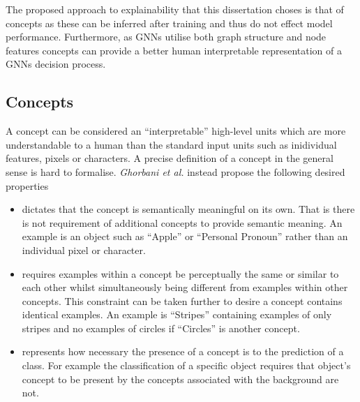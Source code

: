 The proposed approach to explainability that this dissertation choses is that of concepts as these can be inferred after training and thus do not effect model performance.
Furthermore, as GNNs utilise both graph structure and node features concepts can provide a better human interpretable representation of a GNNs decision process.

\subsection{Concepts}



A concept can be considered an ``interpretable'' high-level units which are more understandable to a human than the standard input units such as inidividual features, pixels or characters.
A precise definition of a concept in the general sense is hard to formalise.
\textit{Ghorbani et al.} instead propose the following desired properties
\begin{itemize}
    \item[]
        dictates that the concept is semantically meaningful on its own.
        That is there is not requirement of additional concepts to provide semantic meaning.
        An example is an object such as ``Apple'' or ``Personal Pronoun'' rather than an individual pixel or character.
    \item[]
        requires examples within a concept be perceptually the same or similar to each other whilst simultaneously being different from examples within other concepts.
        This constraint can be taken further to desire a concept contains identical examples.
        An example is ``Stripes'' containing examples of only stripes and no examples of circles if ``Circles'' is another concept.
    \item[]
        represents how necessary the presence of a concept is to the prediction of a class.
        For example the classification of a specific object requires that object's concept to be present by the concepts associated with the background are not.
\end{itemize}


